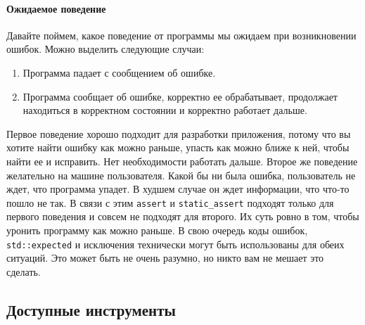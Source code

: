 \paragraph{Ожидаемое поведение}

Давайте поймем, какое поведение от программы мы ожидаем при возникновении ошибок.
Можно выделить следующие случаи:
\begin{enumerate}
\item Программа падает с сообщением об ошибке.

\item Программа сообщает об ошибке, корректно ее обрабатывает, продолжает находиться в корректном состоянии и корректно работает дальше.
\end{enumerate}
Первое поведение хорошо подходит для разработки приложения, потому что вы хотите найти ошибку как можно раньше, упасть как можно ближе к ней, чтобы найти ее и исправить.
Нет необходимости работать дальше.
Второе же поведение желательно на машине пользователя.
Какой бы ни была ошибка, пользователь не ждет, что программа упадет.
В худшем случае он ждет информации, что что-то пошло не так.
В связи с этим \verb"assert" и \verb"static_assert" подходят только для первого поведения и совсем не подходят для второго.
Их суть ровно в том, чтобы уронить программу как можно раньше.
В свою очередь коды ошибок, \verb"std::expected" и исключения технически могут быть использованы для обеих ситуаций.
Это может быть не очень разумно, но никто вам не мешает это сделать.

\subsection{Доступные инструменты}

